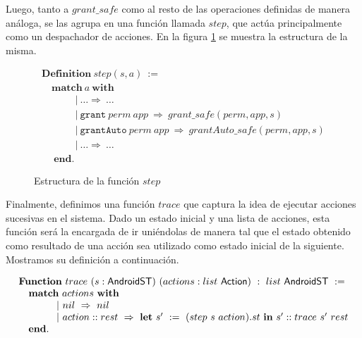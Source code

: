 Luego, tanto a $grant\_safe$ como al resto de las operaciones definidas de manera análoga, se las
agrupa en una función llamada $step$, que actúa principalmente como un despachador de acciones. En
la figura \ref{fig:step} se muestra la estructura de la misma.

\begin{figure}[ht]
    \begin{displaymath}
        \begin{array}{l}
            \textbf{Definition}\ step(s,a)\ :=\                                                               \\
            \quad \textbf{match}\ a\ \textbf{with}                                                            \\
            \quad  \hspace{1cm} |\ \ldots \Rightarrow\ \ldots                                                 \\
            \quad  \hspace{1cm} |\  \texttt{grant}\ perm\ app\ \Rightarrow\ grant\_safe(perm, app, s)         \\
            \quad  \hspace{1cm} |\  \texttt{grantAuto}\ perm\ app\ \Rightarrow\ grantAuto\_safe(perm, app, s) \\
            \quad  \hspace{1cm} |\ \ldots \Rightarrow\ \ldots                                                 \\
            \quad\ \textbf{end}.
        \end{array}
    \end{displaymath}
    \caption{Estructura de la función $step$}
    \label{fig:step}
\end{figure}

Finalmente, definimos una función $trace$ que captura la idea de ejecutar acciones sucesivas en el
sistema. Dado un estado inicial y una lista de acciones, esta función será la encargada de ir
uniéndolas de manera tal que el estado obtenido como resultado de una acción sea utilizado como
estado inicial de la siguiente. Mostramos su definición a continuación.

\begin{displaymath}
    \begin{array}{l}
        \textbf{Function}\ trace\ (s:\AndroidState)\ (actions:list\ \Action)\ :\ list\ \AndroidState \ :=                             \\
        \quad \textbf{match}\ actions\ \textbf{with}                                                                                  \\
        \quad \hspace{1cm} |\ nil\ \Rightarrow\ nil                                                                                   \\
        \quad \hspace{1cm} |\ action::rest\ \Rightarrow\ \textbf{let}\ s'\ :=\ (step\ s\ action).st\ \textbf{in}\ s'::trace\ s'\ rest \\
        \quad \textbf{end}.
    \end{array}
\end{displaymath}

